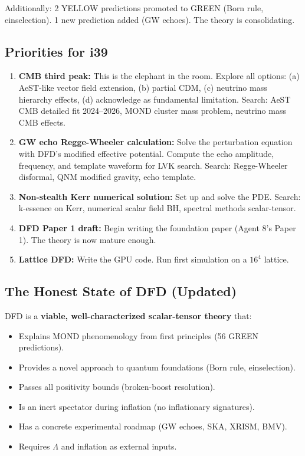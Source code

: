 \documentclass[11pt,a4paper]{article}
\begin{document}
Additionally: 2 YELLOW predictions promoted to GREEN (Born rule, einselection). 1 new prediction added (GW echoes). The theory is consolidating.

\subsection{Priorities for i39}

\begin{enumerate}
\item \textbf{CMB third peak:} This is the elephant in the room. Explore all options: (a) AeST-like vector field extension, (b) partial CDM, (c) neutrino mass hierarchy effects, (d) acknowledge as fundamental limitation. Search: AeST CMB detailed fit 2024--2026, MOND cluster mass problem, neutrino mass CMB effects.

\item \textbf{GW echo Regge-Wheeler calculation:} Solve the perturbation equation with DFD's modified effective potential. Compute the echo amplitude, frequency, and template waveform for LVK search. Search: Regge-Wheeler disformal, QNM modified gravity, echo template.

\item \textbf{Non-stealth Kerr numerical solution:} Set up and solve the PDE. Search: k-essence on Kerr, numerical scalar field BH, spectral methods scalar-tensor.

\item \textbf{DFD Paper 1 draft:} Begin writing the foundation paper (Agent 8's Paper 1). The theory is now mature enough.

\item \textbf{Lattice DFD:} Write the GPU code. Run first simulation on a $16^4$ lattice.
\end{enumerate}

\subsection{The Honest State of DFD (Updated)}

DFD is a \textbf{viable, well-characterized scalar-tensor theory} that:
\begin{itemize}
\item Explains MOND phenomenology from first principles (56 GREEN predictions).
\item Provides a novel approach to quantum foundations (Born rule, einselection).
\item Passes all positivity bounds (broken-boost resolution).
\item Is an inert spectator during inflation (no inflationary signatures).
\item Has a concrete experimental roadmap (GW echoes, SKA, XRISM, BMV).
\item Requires $\Lambda$ and inflation as external inputs.
\end{itemize}
\end{document}
